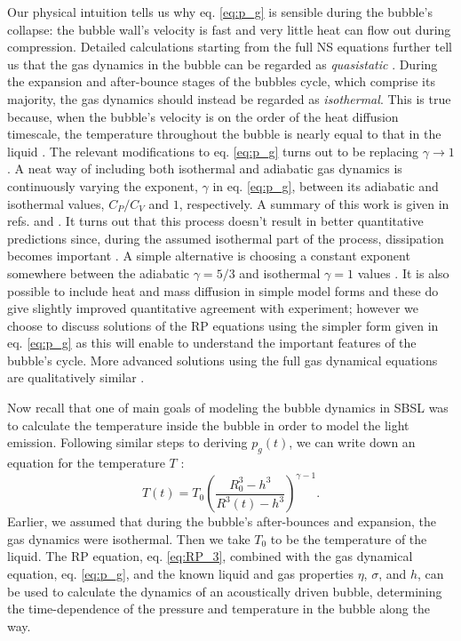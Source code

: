 \documentclass[prb,aps,nofootinbib,superscriptaddress,floatfix]{revtex4-2}
\begin{document}
Our physical intuition tells us why eq. \ref{eq:p_g} is sensible during the bubble's collapse: the bubble wall's velocity is fast and very little heat can flow out during compression. Detailed calculations starting from the full NS equations further tell us that the gas dynamics in the bubble can be regarded as \emph{quasistatic} \cite{}. During the expansion and after-bounce stages of the bubbles cycle, which comprise its majority, the gas dynamics should instead be regarded as \emph{isothermal}. This is true because, when the bubble's velocity is on the order of the heat diffusion timescale, the temperature throughout the bubble is nearly equal to that in the liquid \cite{prosperetti1999old,brenner2002single,yasui2018acoustic}. The relevant modifications to eq. \ref{eq:p_g} turns out to be replacing $\gamma\rightarrow 1$. A neat way of including both isothermal and adiabatic gas dynamics is continuously varying the exponent, $\gamma$ in eq. \ref{eq:p_g}, between its adiabatic and isothermal values, $C_P/C_V$ and $1$, respectively. A summary of this work is given in refs. \cite{brenner2002single} and \cite{prosperetti1999old}. It turns out that this process doesn't result in better quantitative predictions since, during the assumed isothermal part of the process, dissipation becomes important \cite{brenner2002single}. A simple alternative is choosing a constant exponent somewhere between the adiabatic $\gamma=5/3$ and isothermal $\gamma=1$ values \cite{hilgenfeldt1999simple}. It is also possible to include heat and mass diffusion in simple model forms and these do give slightly improved quantitative agreement with experiment; however we choose to discuss solutions of the RP equations using the simpler form given in eq. \ref{eq:p_g} as this will enable to understand the important features of the bubble's cycle. More advanced solutions using the full gas dynamical equations are qualitatively similar \cite{brenner2002single,yasui2018acoustic}.

Now recall that one of main goals of modeling the bubble dynamics in SBSL was to calculate the temperature inside the bubble in order to model the light emission. Following similar steps to deriving $p_g(t)$, we can write down an equation for the temperature $T$ \cite{barber1997defining,brenner2002single}:
\begin{equation}
    T(t) = T_0 \left( \frac{R_0^3-h^3}{R^3(t)-h^3} \right)^ {\gamma-1}.
    \label{eq:T(t)}
\end{equation}
Earlier, we assumed that during the bubble's after-bounces and expansion, the gas dynamics were isothermal. Then we take $T_0$ to be the temperature of the liquid. The RP equation, eq. \ref{eq:RP_3}, combined with the gas dynamical equation, eq. \ref{eq:p_g}, and the known liquid and gas properties $\eta$, $\sigma$, and $h$, can be used to calculate the dynamics of an acoustically driven bubble, determining the time-dependence of the pressure and temperature in the bubble along the way. 
\end{document}
